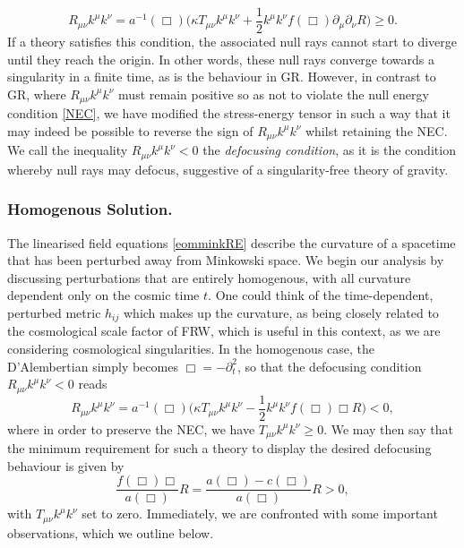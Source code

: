 \[
\label{convergeIDG}
R_{\mu\nu} k^\mu k^\nu=a^{-1}(\Box)\biggl(\kappa T_{\mu\nu}k^\mu k^\nu +\frac{1}{2}k^\mu k^\nu f(\Box)\partial_\mu \partial_\nu R\biggr)\geq 0
.\]
If a theory satisfies this condition, the associated null rays cannot start to diverge until they reach the origin. In other words, these null rays converge towards a singularity in a finite time, as is the behaviour in GR. However, in contrast to GR, where $R_{\mu\nu}k^\mu k^\nu$ 
 must remain positive so as  not to violate the null energy condition \eqref{NEC}, we have modified the stress-energy tensor in such a way that it may indeed be possible to reverse the sign of $R_{\mu\nu}k^\mu k^\nu$ whilst retaining the NEC. We call the inequality $R_{\mu\nu}k^\mu k^\nu<0$ the \emph{defocusing condition}, as it is the condition whereby null rays may defocus, suggestive of a singularity-free theory of gravity.

\subsubsection*{Homogenous Solution.}
The linearised field equations \eqref{eomminkRE} describe the curvature of a spacetime that has been perturbed away from Minkowski space. We begin our analysis by discussing perturbations that are entirely homogenous, with all curvature dependent only on the cosmic time $t$. One could think of the time-dependent, perturbed metric $h_{ij}$ which makes up the curvature, as being closely related to the cosmological scale factor of FRW, which is useful in this context, as we are considering cosmological singularities. In the homogenous case, the D'Alembertian simply becomes $\Box=-\partial_t^2$, so that the defocusing condition $R_{\mu\nu}k^\mu k^\nu<0$ reads \cite{Conroy:2016sac}
\[
\label{divergemink1}
R_{\mu\nu} k^\mu k^\nu=a^{-1}(\Box)\biggl(\kappa T_{\mu\nu}k^\mu k^\nu -\frac{1}{2}k^\mu k^\nu f(\Box)\Box R\biggr)< 0
,\]
where in order to preserve the NEC, we have $T_{\mu\nu}k^\mu k^\nu\geq 0$. We may then say that the minimum requirement for such a theory to display the desired defocusing behaviour is given by
\[
\frac{f(\Box)\Box}{a(\Box)} R= \frac{a(\Box)-c(\Box)}{a(\Box)} R>0
\label{divergemink2}
,\]
with $T_{\mu\nu}k^\mu k^\nu$ set to zero.
Immediately, we are confronted with some important observations, which we outline below.
